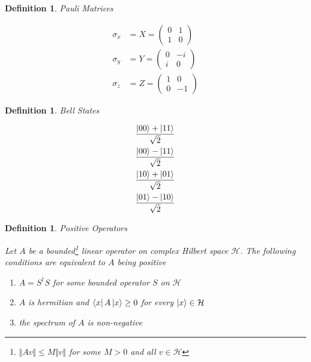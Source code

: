 \documentclass{book}
\newcommand\0{\mathbf{0}}
\newcommand\<{\langle}
\renewcommand\>{\rangle}
\newtheorem{definition}[theorem]{Definition}
\begin{document}
\begin{definition}
\label{pauli}
Pauli Matrices

\begin{align*}
\sigma_x &= X = \begin{pmatrix} 0 & 1 \\ 1 & 0\end{pmatrix} \\
\sigma_y &= Y = \begin{pmatrix} 0 & -i \\ i & 0\end{pmatrix}\\
\sigma_z &= Z = \begin{pmatrix} 1 & 0 \\ 0 & -1\end{pmatrix}
\end{align*}
\end{definition}

\begin{definition}
\label{bellstates}
Bell States

\begin{align*}
\frac{\ket{00} + \ket{11} }{\sqrt{2}} \\	
\frac{\ket{00} - \ket{11} }{\sqrt{2}} \\	
\frac{\ket{10} + \ket{01} }{\sqrt{2}} \\	
\frac{\ket{01} - \ket{10} }{\sqrt{2}}
\end{align*}
\end{definition}

\begin{definition}
\label{posop}
Positive Operators

Let $A$ be a bounded\footnote{$\Vert Av \Vert \leq M\Vert v \Vert$ for some $M>0$ and all $v \in \mathcal{H}$} linear operator on complex Hilbert space $\mathcal{H}$. The following conditions are equivalent to $A$ being positive

\begin{enumerate}
\item $A=S^\dag S$ for some bounded operator $S$ on $\mathcal{H}$
\item $A$ is hermitian and $\bra{x} A \ket{x} \geq 0$ for every $\ket{x} \in \mathcal{H}$
\item the spectrum of $A$ is non-negative
\end{enumerate}
\end{definition}
\end{document}
